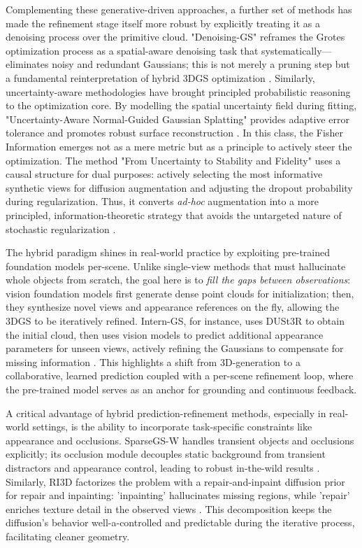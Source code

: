\documentclass[11pt,a4paper]{article}
\begin{document}
Complementing these generative-driven approaches, a further set of methods has made the refinement stage itself more robust by explicitly treating it as a denoising process over the primitive cloud. "Denoising-GS" reframes the Grotes optimization process as a spatial-aware denoising task that systematically---eliminates noisy and redundant Gaussians; this is not merely a pruning step but a fundamental reinterpretation of hybrid 3DGS optimization \cite{arxiv:2605.14880v1}. Similarly, uncertainty-aware methodologies have brought principled probabilistic reasoning to the optimization core. By modelling the spatial uncertainty field during fitting, "Uncertainty-Aware Normal-Guided Gaussian Splatting" provides adaptive error tolerance and promotes robust surface reconstruction \cite{arxiv:2503.11172v1}. In this class, the Fisher Information emerges not as a mere metric but as a principle to actively steer the optimization. The method "From Uncertainty to Stability and Fidelity" uses a causal structure for dual purposes: actively selecting the most informative synthetic views for diffusion augmentation and adjusting the dropout probability during regularization. Thus, it converts \emph{ad-hoc} augmentation into a more principled, information-theoretic strategy that avoids the untargeted nature of stochastic regularization \cite{arxiv:2606.20842v1}.

The hybrid paradigm shines in real-world practice by exploiting pre-trained foundation models per-scene. Unlike single-view methods that must hallucinate whole objects from scratch, the goal here is to \emph{fill the gaps between observations}: vision foundation models first generate dense point clouds for initialization; then, they synthesize novel views and appearance references on the fly, allowing the 3DGS to be iteratively refined. Intern-GS, for instance, uses DUSt3R to obtain the initial cloud, then uses vision models to predict additional appearance parameters for unseen views, actively refining the Gaussians to compensate for missing information \cite{arxiv:2505.20729v1}. This highlights a shift from 3D-generation to a collaborative, learned prediction coupled with a per-scene refinement loop, where the pre-trained model serves as an anchor for grounding and continuous feedback.

A critical advantage of hybrid prediction-refinement methods, especially in real-world settings, is the ability to incorporate task-specific constraints like appearance and occlusions. SparseGS-W handles transient objects and occlusions explicitly; its occlusion module decouples static background from transient distractors and appearance control, leading to robust in-the-wild results \cite{arxiv:2503.19452v1}. Similarly, RI3D factorizes the problem with a repair-and-inpaint diffusion prior for repair and inpainting: 'inpainting' hallucinates missing regions, while 'repair' enriches texture detail in the observed views \cite{arxiv:2503.10860v2}. This decomposition keeps the diffusion's behavior well-a-controlled and predictable during the iterative process, facilitating cleaner geometry.
\end{document}

